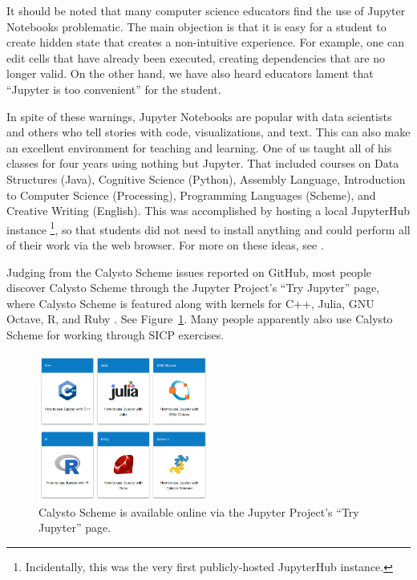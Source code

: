 \documentclass[acmsmall,screen,anonymous,review]{acmart}
\begin{document}
It should be noted that many computer science educators find the use
of Jupyter Notebooks problematic. The main objection is that it is
easy for a student to create hidden state that creates a non-intuitive
experience. For example, one can edit cells that have already been
executed, creating dependencies that are no longer valid. On the other
hand, we have also heard educators lament that ``Jupyter is too
convenient'' for the student.

In spite of these warnings, Jupyter Notebooks are popular with data scientists
and others who tell stories with code, visualizations, and text. This can also
make an excellent environment for teaching and learning. One of us
taught all of his classes for four years using nothing but Jupyter. That
included courses on Data Structures (Java), Cognitive Science (Python),
Assembly Language, Introduction to Computer Science (Processing), Programming
Languages (Scheme), and Creative Writing (English). This was accomplished by
hosting a local JupyterHub instance
\footnote[2]{Incidentally, this was the very first publicly-hosted
  JupyterHub instance.}, so that students did not need to install anything and
could perform all of their work via the web browser. For more on these ideas,
see \cite{Calico2}.

Judging from the Calysto Scheme issues reported on GitHub, most people discover
Calysto Scheme through the Jupyter Project's ``Try Jupyter'' page, where
Calysto Scheme is featured along with kernels for C++, Julia, GNU Octave, R,
and Ruby \cite{TryJupyter}. See Figure~\ref{fig:try-jupyter}. Many people
apparently also use Calysto Scheme for working through SICP exercises.

\begin{figure}[h]
  \centering
  \includegraphics[width=0.5\textwidth]{try-jupyter.png}
  \caption{Calysto Scheme is available online via the Jupyter Project's ``Try Jupyter'' page.}
  \label{fig:try-jupyter}
\end{figure}
\end{document}
